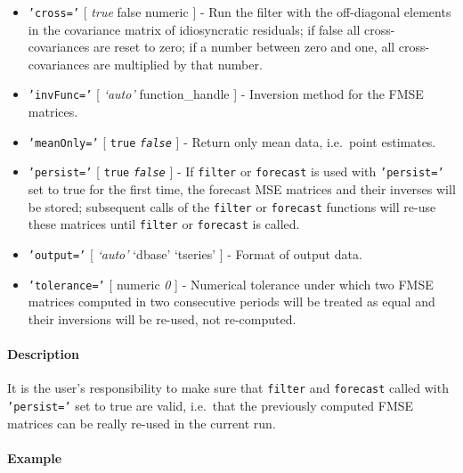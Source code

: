  \begin{itemize}
 \item
   \texttt{'cross='} {[} \emph{true} \textbar{} false \textbar{} numeric
   {]} - Run the filter with the off-diagonal elements in the covariance
   matrix of idiosyncratic residuals; if false all cross-covariances are
   reset to zero; if a number between zero and one, all cross-covariances
   are multiplied by that number.
 \item
   \texttt{'invFunc='} {[} \emph{`auto'} \textbar{} function\_handle {]}
   - Inversion method for the FMSE matrices.
 \item
   \texttt{'meanOnly='} {[} \texttt{true} \textbar{}
   \emph{\texttt{false}} {]} - Return only mean data, i.e.~point
   estimates.
 \item
   \texttt{'persist='} {[} \texttt{true} \textbar{} \emph{\texttt{false}}
   {]} - If \texttt{filter} or \texttt{forecast} is used with
   \texttt{'persist='} set to true for the first time, the forecast MSE
   matrices and their inverses will be stored; subsequent calls of the
   \texttt{filter} or \texttt{forecast} functions will re-use these
   matrices until \texttt{filter} or \texttt{forecast} is called.
 \item
   \texttt{'output='} {[} \emph{`auto'} \textbar{} `dbase' \textbar{}
   `tseries' {]} - Format of output data.
 \item
   \texttt{'tolerance='} {[} numeric \textbar{} \emph{0} {]} - Numerical
   tolerance under which two FMSE matrices computed in two consecutive
   periods will be treated as equal and their inversions will be re-used,
   not re-computed.
 \end{itemize}
 
 \paragraph{Description}
 
 It is the user's responsibility to make sure that \texttt{filter} and
 \texttt{forecast} called with \texttt{'persist='} set to true are valid,
 i.e.~that the previously computed FMSE matrices can be really re-used in
 the current run.
 
 \paragraph{Example}


